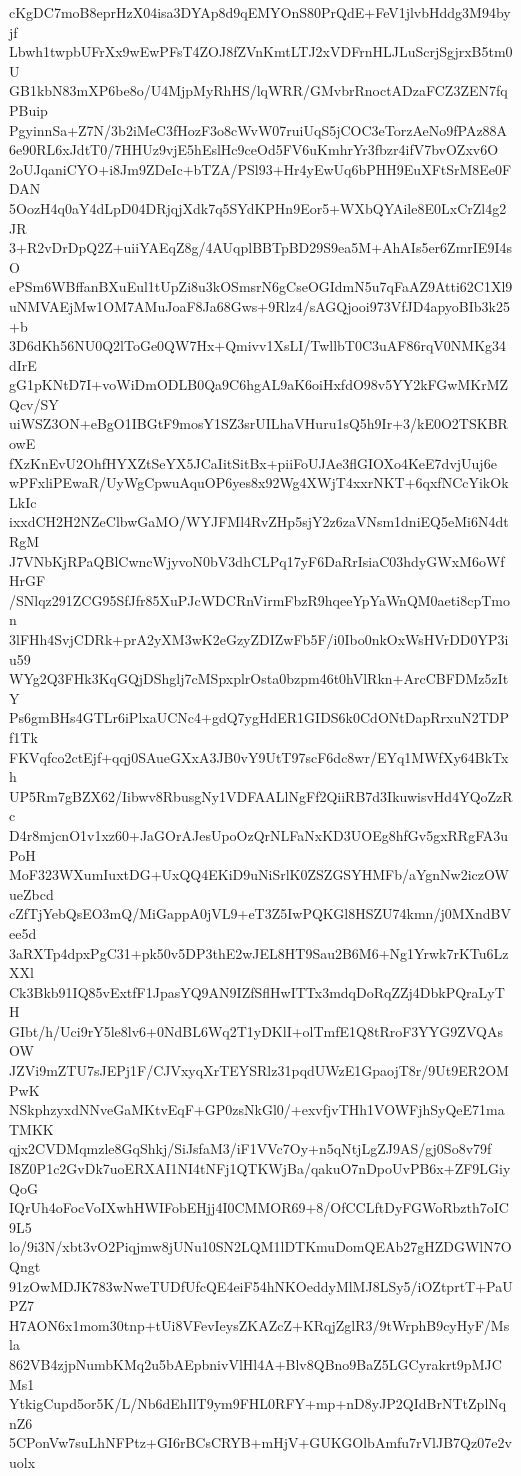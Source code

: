 cKgDC7moB8eprHzX04isa3DYAp8d9qEMYOnS80PrQdE+FeV1jlvbHddg3M94byjf
Lbwh1twpbUFrXx9wEwPFsT4ZOJ8fZVnKmtLTJ2xVDFrnHLJLuScrjSgjrxB5tm0U
GB1kbN83mXP6be8o/U4MjpMyRhHS/lqWRR/GMvbrRnoctADzaFCZ3ZEN7fqPBuip
PgyinnSa+Z7N/3b2iMeC3fHozF3o8cWvW07ruiUqS5jCOC3eTorzAeNo9fPAz88A
6e90RL6xJdtT0/7HHUz9vjE5hEslHc9ceOd5FV6uKmhrYr3fbzr4ifV7bvOZxv6O
2oUJqaniCYO+i8Jm9ZDeIc+bTZA/PSl93+Hr4yEwUq6bPHH9EuXFtSrM8Ee0FDAN
5OozH4q0aY4dLpD04DRjqjXdk7q5SYdKPHn9Eor5+WXbQYAile8E0LxCrZl4g2JR
3+R2vDrDpQ2Z+uiiYAEqZ8g/4AUqplBBTpBD29S9ea5M+AhAIs5er6ZmrIE9I4sO
ePSm6WBffanBXuEul1tUpZi8u3kOSmsrN6gCseOGIdmN5u7qFaAZ9Atti62C1Xl9
uNMVAEjMw1OM7AMuJoaF8Ja68Gws+9Rlz4/sAGQjooi973VfJD4apyoBIb3k25+b
3D6dKh56NU0Q2lToGe0QW7Hx+Qmivv1XsLI/TwllbT0C3uAF86rqV0NMKg34dIrE
gG1pKNtD7I+voWiDmODLB0Qa9C6hgAL9aK6oiHxfdO98v5YY2kFGwMKrMZQcv/SY
uiWSZ3ON+eBgO1IBGtF9mosY1SZ3srUILhaVHuru1sQ5h9Ir+3/kE0O2TSKBRowE
fXzKnEvU2OhfHYXZtSeYX5JCaIitSitBx+piiFoUJAe3flGIOXo4KeE7dvjUuj6e
wPFxliPEwaR/UyWgCpwuAquOP6yes8x92Wg4XWjT4xxrNKT+6qxfNCcYikOkLkIc
ixxdCH2H2NZeClbwGaMO/WYJFMl4RvZHp5sjY2z6zaVNsm1dniEQ5eMi6N4dtRgM
J7VNbKjRPaQBlCwncWjyvoN0bV3dhCLPq17yF6DaRrIsiaC03hdyGWxM6oWfHrGF
/SNlqz291ZCG95SfJfr85XuPJcWDCRnVirmFbzR9hqeeYpYaWnQM0aeti8cpTmon
3lFHh4SvjCDRk+prA2yXM3wK2eGzyZDIZwFb5F/i0Ibo0nkOxWsHVrDD0YP3iu59
WYg2Q3FHk3KqGQjDShglj7cMSpxplrOsta0bzpm46t0hVlRkn+ArcCBFDMz5zItY
Ps6gmBHs4GTLr6iPlxaUCNc4+gdQ7ygHdER1GIDS6k0CdONtDapRrxuN2TDPf1Tk
FKVqfco2ctEjf+qqj0SAueGXxA3JB0vY9UtT97scF6dc8wr/EYq1MWfXy64BkTxh
UP5Rm7gBZX62/Iibwv8RbusgNy1VDFAALlNgFf2QiiRB7d3IkuwisvHd4YQoZzRc
D4r8mjcnO1v1xz60+JaGOrAJesUpoOzQrNLFaNxKD3UOEg8hfGv5gxRRgFA3uPoH
MoF323WXumIuxtDG+UxQQ4EKiD9uNiSrlK0ZSZGSYHMFb/aYgnNw2iczOWueZbcd
cZfTjYebQsEO3mQ/MiGappA0jVL9+eT3Z5IwPQKGl8HSZU74kmn/j0MXndBVee5d
3aRXTp4dpxPgC31+pk50v5DP3thE2wJEL8HT9Sau2B6M6+Ng1Yrwk7rKTu6LzXXl
Ck3Bkb91IQ85vExtfF1JpasYQ9AN9IZfSflHwITTx3mdqDoRqZZj4DbkPQraLyTH
GIbt/h/Uci9rY5le8lv6+0NdBL6Wq2T1yDKlI+olTmfE1Q8tRroF3YYG9ZVQAsOW
JZVi9mZTU7sJEPj1F/CJVxyqXrTEYSRlz31pqdUWzE1GpaojT8r/9Ut9ER2OMPwK
NSkphzyxdNNveGaMKtvEqF+GP0zsNkGl0/+exvfjvTHh1VOWFjhSyQeE71maTMKK
qjx2CVDMqmzle8GqShkj/SiJsfaM3/iF1VVc7Oy+n5qNtjLgZJ9AS/gj0So8v79f
I8Z0P1c2GvDk7uoERXAI1NI4tNFj1QTKWjBa/qakuO7nDpoUvPB6x+ZF9LGiyQoG
IQrUh4oFocVoIXwhHWIFobEHjj4I0CMMOR69+8/OfCCLftDyFGWoRbzth7oIC9L5
lo/9i3N/xbt3vO2Piqjmw8jUNu10SN2LQM1lDTKmuDomQEAb27gHZDGWlN7OQngt
91zOwMDJK783wNweTUDfUfcQE4eiF54hNKOeddyMlMJ8LSy5/iOZtprtT+PaUPZ7
H7AON6x1mom30tnp+tUi8VFevIeysZKAZcZ+KRqjZglR3/9tWrphB9cyHyF/Msla
862VB4zjpNumbKMq2u5bAEpbnivVlHl4A+Blv8QBno9BaZ5LGCyrakrt9pMJCMs1
YtkigCupd5or5K/L/Nb6dEhIlT9ym9FHL0RFY+mp+nD8yJP2QIdBrNTtZplNqnZ6
5CPonVw7suLhNFPtz+GI6rBCsCRYB+mHjV+GUKGOlbAmfu7rVlJB7Qz07e2vuolx
